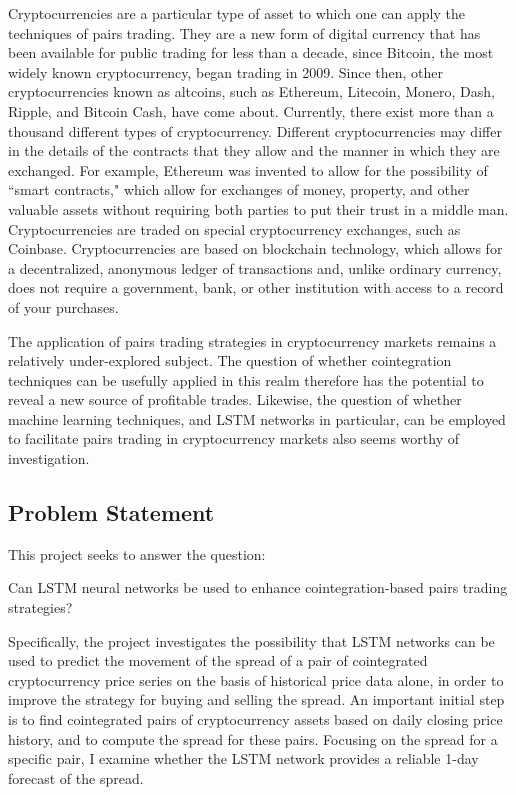 \documentclass{article}
\begin{document}
Cryptocurrencies are a particular type of asset to which one can apply the techniques of pairs trading. They are a new form of digital currency that has been available for public trading for less than a decade, since Bitcoin, the most widely known cryptocurrency, began trading in 2009.  Since then, other cryptocurrencies known as altcoins, such as Ethereum, Litecoin, Monero, Dash, Ripple, and Bitcoin Cash, have come about. Currently, there exist more than a thousand different types of cryptocurrency. Different cryptocurrencies may differ in the details of the contracts that they allow and the manner in which they are exchanged. For example, Ethereum was invented to allow for the possibility of ``smart contracts," which allow for exchanges of money, property, and other valuable assets without requiring both parties to put their trust in a middle man. Cryptocurrencies are traded on special cryptocurrency exchanges, such as Coinbase. Cryptocurrencies are based on blockchain technology, which allows for a decentralized, anonymous ledger of transactions and, unlike ordinary currency, does not require a government, bank, or other institution with access to a record of your purchases. 

The application of pairs trading strategies in cryptocurrency markets remains a relatively under-explored subject. The question of whether cointegration techniques can be usefully applied in this realm therefore has the potential to reveal a new source of profitable trades. Likewise, the question of whether machine learning techniques, and LSTM networks in particular, can be employed to facilitate pairs trading in cryptocurrency markets also seems worthy of investigation. 

\subsection{Problem Statement}

This project seeks to answer the question:

Can LSTM neural networks be used to enhance cointegration-based pairs trading strategies?

Specifically, the project investigates the possibility that LSTM networks can be used to predict the movement of the spread of a pair of cointegrated cryptocurrency price series on the basis of historical price data alone, in order to improve the strategy for buying and selling the spread. An important  initial step is to find cointegrated pairs of cryptocurrency assets based on daily closing price history, and to compute the spread for these pairs. Focusing on the spread for a specific pair, I examine whether the LSTM network provides a reliable 1-day forecast of the spread. 
\end{document}
